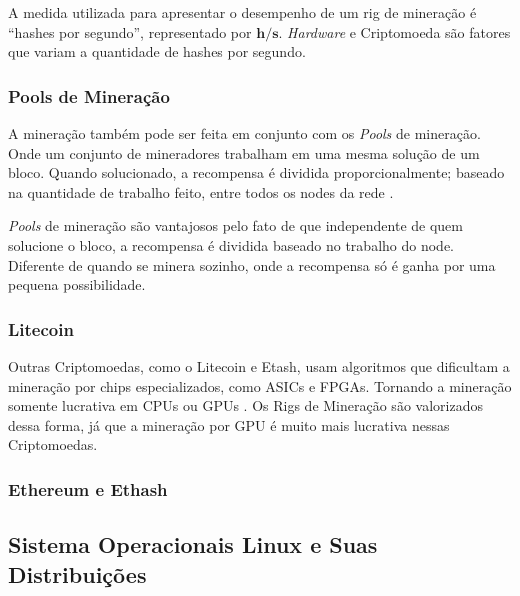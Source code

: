 \documentclass[
article,			%
12pt,				%
openright,			%
oneside,			%
a4paper,			%
chapter=TITLE,		%
section=TITLE,		%
subsection=TITLE,	%
subsubsection=TITLE,%
subsubsubsection=TITLE, %
english,			%
brazil,				%
]{abntex2}
\begin{document}
\pagebreak

A medida utilizada para apresentar o desempenho de um rig de mineração
é ``hashes por segundo'', representado por $\mathbf{h/s}$.
\emph{Hardware} e Criptomoeda são fatores que variam a quantidade de
hashes por segundo.

\subsubsection{Pools de Mineração}

A mineração também pode ser feita em conjunto com os \emph{Pools} de
mineração. Onde um conjunto de mineradores trabalham em uma mesma
solução de um bloco. Quando solucionado, a recompensa é dividida
proporcionalmente; baseado na quantidade de trabalho feito, entre
todos os nodes da rede \cite{Weber2012}.

\emph{Pools} de mineração são vantajosos pelo fato de que independente
de quem solucione o bloco, a recompensa é dividida baseado no trabalho
do node. Diferente de quando se minera sozinho, onde a recompensa só é
ganha por uma pequena possibilidade.

\subsubsection{Litecoin}

Outras Criptomoedas, como o Litecoin e Etash, usam algoritmos que
dificultam a mineração por chips especializados, como ASICs e FPGAs.
Tornando a mineração somente lucrativa em CPUs ou GPUs
\cite{Weber2012}. Os Rigs de Mineração são valorizados dessa forma, já
que a mineração por GPU é muito mais lucrativa nessas Criptomoedas.

\subsubsection{Ethereum e Ethash}

\subsection{Sistema Operacionais Linux e Suas Distribuições}
\end{document}
